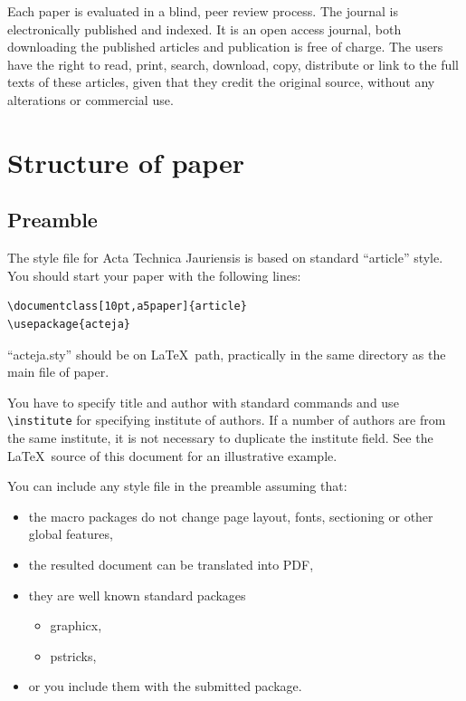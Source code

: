 \documentclass[10pt,a5paper]{article}
\begin{document}
Each paper is evaluated in a blind, peer review process. The journal is 
electronically published and indexed. It is an open access journal, both 
downloading the published articles and publication is free of charge. 
The users have the right to read, print, search, download, copy, distribute 
or link to the full texts of these articles, given that they credit the original
 source, without any alterations or commercial use.

\section{Structure of paper}

\subsection{Preamble}

The style file for Acta Technica Jauriensis is based on standard ``article''
style. You should start your paper with the following lines:
\begin{verbatim}
\documentclass[10pt,a5paper]{article}
\usepackage{acteja}
\end{verbatim}

``acteja.sty'' should be on \LaTeX\ path, practically in the same directory as
the main file of paper.

You have to specify title and author with standard commands and use
\verb+\institute+ for specifying institute of authors. If a number of authors
are from the same institute, it is not necessary to duplicate the institute
field. See the \LaTeX\ source of this document for an illustrative example.

You can include any style file in the preamble assuming that:
\begin{itemize}
 \item the macro packages do not change page layout, fonts,
 sectioning or other global features,
 \item the resulted document can be translated into PDF,
 \item they are well known standard packages
  \begin{itemize}
   \item graphicx,
   \item pstricks,
  \end{itemize}
 \item or you include them with the submitted package.
\end{itemize}
\end{document}
